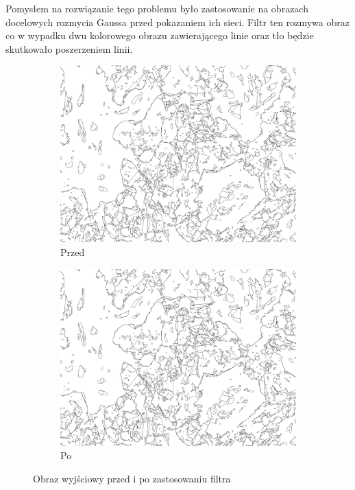 \documentclass{article}
\begin{document}
Pomysłem na rozwiązanie tego problemu było zastosowanie na obrazach docelowych rozmycia Gaussa przed pokazaniem ich sieci.
Filtr ten rozmywa obraz co w wypadku dwu kolorowego obrazu zawierającego linie oraz tło będzie skutkowało poszerzeniem linii.
\begin{figure}[H]
  \centering
  \begin{subfigure}{0.4\linewidth}
    \includegraphics[width=\linewidth]{images/output.jpg}
    \caption{Przed}
  \end{subfigure}
  \begin{subfigure}{0.4\linewidth}
    \includegraphics[width=\linewidth]{images/output.jpg}
    \caption{Po}
  \end{subfigure}
  \caption{Obraz wyjściowy przed i po zastosowaniu filtra}
  \label{fig:input_split}
\end{figure}
\end{document}
